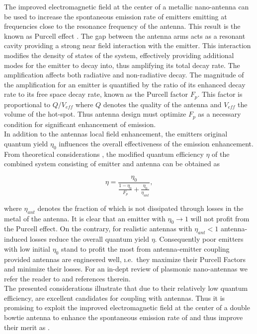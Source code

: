 		The improved electromagnetic field at the center of a metallic nano-antenna can be used to increase the spontaneous emission rate of emitters emitting at frequencies close to the resonance frequency of the antenna. This result is the known as Purcell effect \cite{nancy::86}. The gap between the antenna arms acts as a resonant cavity providing a strong near field interaction with the emitter. This interaction modifies the density of states of the system, effectively providing additional modes for the emitter to decay into, thus amplifying its total decay rate. The amplification affects both radiative and non-radiative decay.
		The magnitude of the amplification for an emitter is quantified by the ratio of its enhanced decay rate to its free space decay rate, known as the Purcell factor $F_p$. This factor is proportional to $Q/V_{eff}$ where $Q$ denotes the quality of the antenna and $V_{eff}$ the volume of the hot-spot. Thus antenna design must optimize $F_p$ as a necessary condition for significant enhancement of \fl emission.
		\\
		In addition to the antennas local field enhancement, the emitters original quantum yield $\eta_0$ influences the overall effectiveness of the emission enhancement. From theoretical considerations \cite{nancy::thesis, nancy::140, nancy::162, nancy::163}, the modified quantum efficiency $\eta$ of the combined system consisting of emitter and antenna can be obtained as

		\begin{equation}
			\eta = \frac{\eta_0}{\frac{1-\eta_0}{F_p} + \frac{\eta_0}{\eta_{ant}} },
		\end{equation}

		where $\eta_{ant}$ denotes the fraction of \fl which is not dissipated through losses in the metal of the antenna. It is clear that an emitter with $\eta_0 \to 1$ will not profit from the Purcell effect. On the contrary, for realistic antennas with $\eta_{ant} < 1$ antenna-induced losses reduce the overall quantum yield $\eta$. Consequently poor emitters with low initial $\eta_{0}$ stand to profit the most from antenna-emitter coupling provided antennas are engineered well, \i.e.\ they maximize their Purcell Factors and minimize their losses. For an in-dept review of plasmonic nano-antennas we refer the reader to \cite{nancy::thesis} and references therein.
		\\
		The presented considerations illustrate that due to their relatively low quantum efficiency, \sivs are excellent candidates for coupling with antennas. Thus it is promising to exploit the improved electromagnetic field at the center of a double bowtie antenna to enhance the spontaneous emission rate of \sivs and thus improve their merit as \spss.

